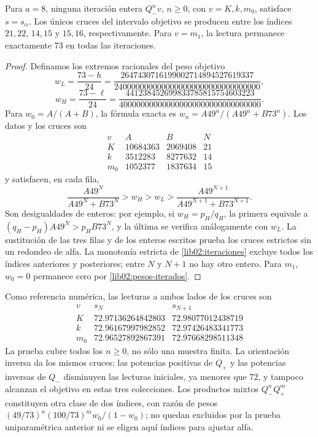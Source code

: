 \begin{proposition}
\label{lib02:cruces-enteros}
Para \(a=8\), ninguna iteración entera \(Q_-^nv\), \(n\geq0\),
con \(v=K,k,m_0\), satisface \(s=s_\alpha\). Los únicos cruces
del intervalo objetivo se producen entre los índices \(21,22\),
\(14,15\) y \(15,16\), respectivamente. Para \(v=m_1\), la
lectura permanece exactamente 73 en todas las iteraciones.
\end{proposition}
\begin{proof}
Definamos los extremos racionales del peso objetivo
\[
 w_L=\frac{73-h}{24}
 =\frac{2647430716199002714894527619337}
 {2400000000000000000000000000000000},
\]
\[
 w_H=\frac{73-\ell}{24}
 =\frac{441238452699833785815754603223}
 {400000000000000000000000000000000}.
\]
Para \(w_0=A/(A+B)\), la fórmula exacta es
\(w_n=A49^n/(A49^n+B73^n)\). Los datos y los cruces son
\[
\begin{array}{c|r|r|c}
 v&A&B&N\\\hline
 K&10684363&2069408&21\\
 k&3512283&8277632&14\\
 m_0&1052377&1837634&15
\end{array}
\]
y satisfacen, en cada fila,
\[
 \frac{A49^N}{A49^N+B73^N}>w_H>w_L>
 \frac{A49^{N+1}}{A49^{N+1}+B73^{N+1}}.
\]
Son desigualdades de enteros: por ejemplo, si
\(w_H=p_H/q_H\), la primera equivale a
\((q_H-p_H)A49^N>p_HB73^N\), y la última se verifica
análogamente con \(w_L\). La sustitución de las tres filas y de
los enteros escritos prueba los cruces estrictos sin un redondeo de
alfa. La monotonía estricta de \cref{lib02:iteraciones} excluye
todos los índices anteriores y posteriores; entre \(N\) y
\(N+1\) no hay otro entero. Para \(m_1\), \(w_0=0\) permanece
cero por \eqref{lib02:pesos-iterados}.
\end{proof}

Como referencia numérica, las lecturas a ambos lados de los cruces son
\[
\begin{array}{c|c|c}
 v&s_N&s_{N+1}\\\hline
 K&72.97136264842803&72.98077012438719\\
 k&72.96167997982852&72.97426483341773\\
 m_0&72.96527892867391&72.97668298511348
\end{array}
\]
La prueba cubre todos los \(n\geq0\), no sólo una muestra finita.
La orientación inversa da los mismos cruces; las potencias positivas de
\(Q_+\) y las potencias inversas de \(Q_-\) disminuyen las
lecturas iniciales, ya menores que 72, y tampoco alcanzan el objetivo
en estas tres colecciones. Los productos mixtos \(Q_-^nQ_+^m\)
constituyen otra clase de dos índices, con razón de pesos
\((49/73)^n(100/73)^m w_0/(1-w_0)\); no quedan excluidos por
la prueba uniparamétrica anterior ni se eligen aquí índices para ajustar
alfa.

